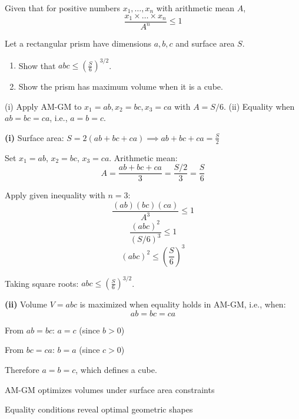 \begin{problem}
Given that for positive numbers $x_1, \dots, x_n$ with arithmetic mean $A$,
\[ \frac{x_1 \times \dots \times x_n}{A^n} \le 1 \]

Let a rectangular prism have dimensions $a, b, c$ and surface area $S$.

\begin{enumerate}
    \item[(i)] Show that $abc \le \left(\frac{S}{6}\right)^{3/2}$.
    \item[(ii)] Show the prism has maximum volume when it is a cube.
\end{enumerate}
\end{problem}

\begin{hint}
(i) Apply AM-GM to $x_1=ab, x_2=bc, x_3=ca$ with $A = S/6$. (ii) Equality when $ab=bc=ca$, i.e., $a=b=c$.
\end{hint}

\begin{solution}
\textbf{(i)} Surface area: $S = 2(ab + bc + ca) \implies ab + bc + ca = \frac{S}{2}$

Set $x_1 = ab$, $x_2 = bc$, $x_3 = ca$. Arithmetic mean:
\[ A = \frac{ab + bc + ca}{3} = \frac{S/2}{3} = \frac{S}{6} \]

Apply given inequality with $n=3$:
\[ \frac{(ab)(bc)(ca)}{A^3} \le 1 \]
\[ \frac{(abc)^2}{(S/6)^3} \le 1 \]
\[ (abc)^2 \le \left(\frac{S}{6}\right)^3 \]

Taking square roots: $abc \le \left(\frac{S}{6}\right)^{3/2}$.

\textbf{(ii)} Volume $V = abc$ is maximized when equality holds in AM-GM, i.e., when:
\[ ab = bc = ca \]

From $ab = bc$: $a = c$ (since $b > 0$)

From $bc = ca$: $b = a$ (since $c > 0$)

Therefore $a = b = c$, which defines a cube.
\end{solution}

\begin{takeaways}

\item AM-GM optimizes volumes under surface area constraints
\item Equality conditions reveal optimal geometric shapes

\end{takeaways}
